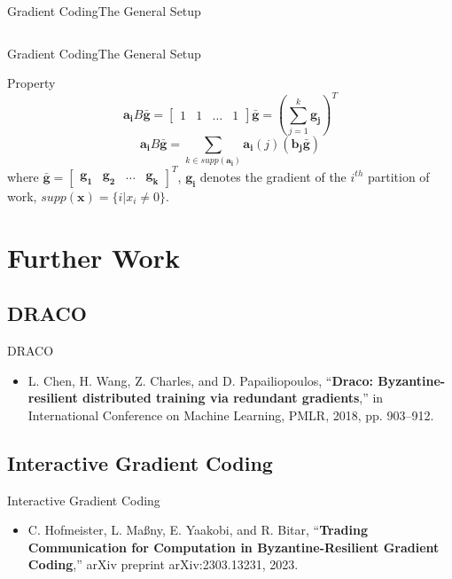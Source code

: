 \documentclass{beamer}
\begin{document}
\begin{frame}{Gradient Coding}{The General Setup}
\begin{columns}
\begin{column}{.5\linewidth}
\end{column}

\end{columns}

\end{frame}

\begin{frame}{Gradient Coding}{The General Setup}

\begin{block}{Property}
    \[\boldsymbol{a_i}B\boldsymbol{\bar{g}} = \begin{bmatrix}
        1 & 1 & \dots & 1
    \end{bmatrix}\boldsymbol{\bar{g}} = (\sum_{j=1}^{k}\boldsymbol{g_j})^T\]
    \[\boldsymbol{a_i}B\boldsymbol{\bar{g}} = \sum_{k\in supp(\boldsymbol{a_i})}\boldsymbol{a_i}(j)(\boldsymbol{b_j} \boldsymbol{\bar{g}})\]
    where $\boldsymbol{\bar{g}} = \begin{bmatrix}
        \boldsymbol{g_1} & \boldsymbol{g_2} & \dots & \boldsymbol{g_k}
    \end{bmatrix}^T$, $\boldsymbol{g_i}$ denotes the gradient of the $i^{th}$ partition of work, $supp(\boldsymbol{x}) = \{i | x_i \neq 0\}$.
\end{block}


\end{frame}

\section{Further Work}

\subsection{DRACO}

\begin{frame}{DRACO}

    \begin{itemize}
        \item L. Chen, H. Wang, Z. Charles, and D. Papailiopoulos, “\textbf{Draco: Byzantine-resilient distributed training via redundant gradients},” in International Conference on Machine Learning, PMLR, 2018, pp. 903–912.
    \end{itemize}

\end{frame}

\subsection{Interactive Gradient Coding}

\begin{frame}{Interactive Gradient Coding}

    \begin{itemize}
        \item C. Hofmeister, L. Maßny, E. Yaakobi, and R. Bitar, “\textbf{Trading Communication for Computation in Byzantine-Resilient Gradient Coding},” arXiv preprint arXiv:2303.13231, 2023.
    \end{itemize}

\end{frame}
\end{document}
